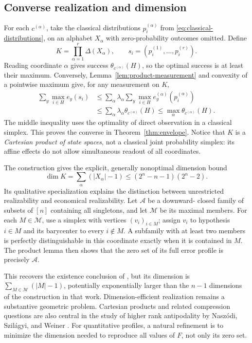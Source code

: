 \documentclass[10pt,a4paper]{amsart}
\newcommand{\1}{\mathbf 1}
\begin{document}
\subsection{Converse realization and dimension}

For each $c^{(\alpha)}$, take the classical distributions
$p_i^{(\alpha)}$ from \eqref{eq:classical-distributions}, on an alphabet
$X_\alpha$ with zero-probability outcomes omitted. Define
\begin{equation}\label{eq:product-realization}
 K=\prod_{\alpha=1}^r\Delta(X_\alpha),\qquad
 s_i=(p_i^{(1)},\ldots,p_i^{(r)}).
\end{equation}
Reading coordinate $\alpha$ gives success $\theta_{c^{(\alpha)}}(H)$, so the
optimal success is at least their maximum. Conversely,
Lemma~\ref{lem:product-measurement} and convexity of a pointwise maximum give,
for any measurement on $K$,
\begin{align*}
 \sum_y\max_{i\in H}e_y(s_i)
 &\le\sum_\alpha\lambda_\alpha
       \sum_y\max_{i\in H}e_y^{(\alpha)}(p_i^{(\alpha)})\\
 &\le\sum_\alpha\lambda_\alpha\theta_{c^{(\alpha)}}(H)
 \le\max_\alpha\theta_{c^{(\alpha)}}(H).
\end{align*}
The middle inequality uses the optimality of direct observation in a classical
simplex. This proves the converse in Theorem~\ref{thm:envelope}. Notice that
$K$ is a \emph{Cartesian product of state spaces}, not a classical joint
probability simplex: its affine effects do not allow simultaneous readout of
all coordinates.

The construction gives the explicit, generally nonoptimal dimension bound
\begin{equation}\label{eq:dimension-bound}
 \dim K=\sum_\alpha(|X_\alpha|-1)
 \le(2^n-n-1)(2^n-2).
\end{equation}
Its qualitative specialization explains the distinction between unrestricted
realizability and economical realizability. Let $\mathcal A$ be a downward-
closed family of subsets of $[n]$ containing all singletons, and let
$\mathcal M$ be its maximal members. For each $M\in\mathcal M$, use a simplex
with vertices $(v_i)_{i\in M}$; assign $v_i$ to hypothesis $i\in M$ and its
barycenter to every $i\notin M$. A subfamily with at least two members is
perfectly distinguishable in this coordinate exactly when it is contained in
$M$. The product lemma then shows that the zero set of its full error profile
is precisely $\mathcal A$.

This recovers the existence conclusion of \cite{Weiner2025}, but its dimension
is $\sum_{M\in\mathcal M}(|M|-1)$, potentially exponentially larger than the
$n-1$ dimensions of the construction in that work. Dimension-efficient
realization remains a substantive geometric problem. Cartesian products and
related compression questions are also central in the study of higher rank
antipodality by Nasz\'odi, Szil\'agyi, and Weiner
\cite{NaszodiSzilagyiWeiner2025}. For quantitative profiles, a natural refinement
is to minimize the dimension needed to reproduce all values of $F$, not only
its zero set.
\end{document}
